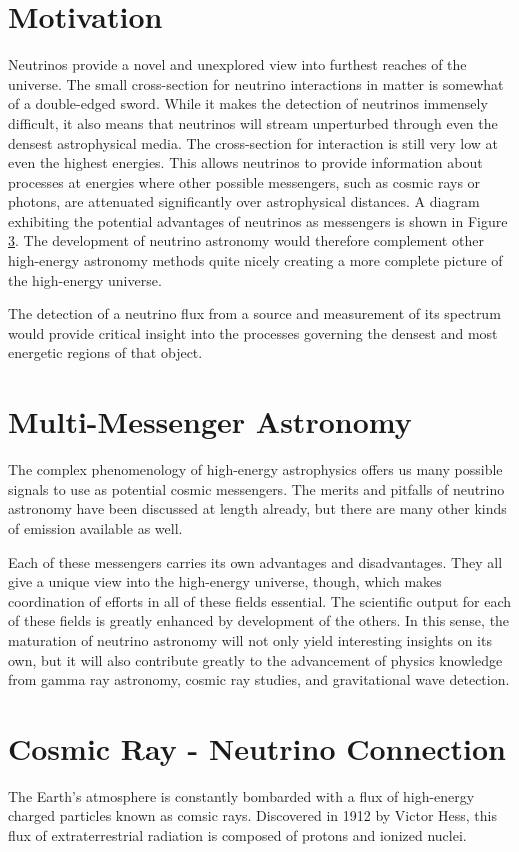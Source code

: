 \documentclass{gatech-thesis}
\begin{document}
\section{Motivation}
Neutrinos provide a novel and unexplored view into furthest reaches of the universe. The small cross-section for neutrino interactions in matter is somewhat of a double-edged sword. While it makes the detection of neutrinos immensely difficult, it also means that neutrinos will stream unperturbed through even the densest astrophysical media. The cross-section for interaction is still very low at even the highest energies. This allows neutrinos to provide information about processes at energies where other possible messengers, such as cosmic rays or photons, are attenuated significantly over astrophysical distances. A diagram exhibiting the potential advantages of neutrinos as messengers is shown in Figure \ref{}. The development of neutrino astronomy would therefore complement other high-energy astronomy methods quite nicely creating a more complete picture of the high-energy universe.


The detection of a neutrino flux from a source and measurement of its spectrum would provide critical insight into the processes governing the densest and most energetic regions of that object.

\section{Multi-Messenger Astronomy}
The complex phenomenology of high-energy astrophysics offers us many possible signals to use as potential cosmic messengers. The merits and pitfalls of neutrino astronomy have been discussed at length already, but there are many other kinds of emission available as well.

 Each of these messengers carries its own advantages and disadvantages. They all give a unique view into the high-energy universe, though, which makes coordination of efforts in all of these fields essential. The scientific output for each of these fields is greatly enhanced by development of the others. In this sense, the maturation of neutrino astronomy will not only yield interesting insights on its own, but it will also contribute greatly to the advancement of physics knowledge from gamma ray astronomy, cosmic ray studies, and gravitational wave detection.
\section{Cosmic Ray - Neutrino Connection}
The Earth's atmosphere is constantly bombarded with a flux of high-energy charged particles known as comsic rays. Discovered in 1912 by Victor Hess, this flux of extraterrestrial radiation is composed of protons and ionized nuclei.
\end{document}
